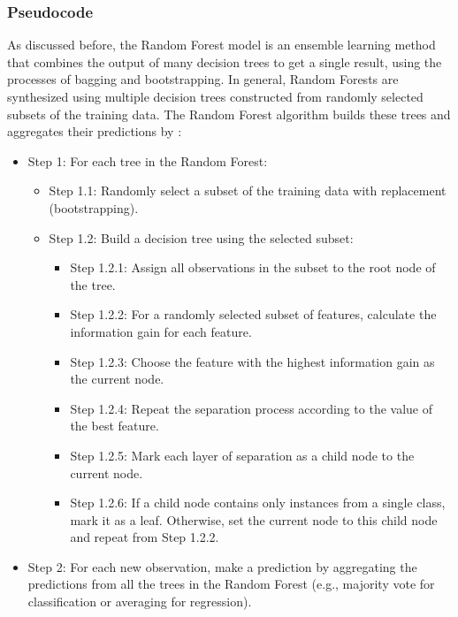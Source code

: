 \begin{appendices}
    \subsubsection{Pseudocode}

    As discussed before, the Random Forest model is an ensemble learning method that combines the output of many decision trees to get a single result, using the processes of bagging and bootstrapping. 
  In general, Random Forests are synthesized using multiple decision trees constructed from randomly selected subsets of the training data. The Random Forest algorithm builds these trees and aggregates their predictions by \cite{bernstein}:

    \begin{itemize}
        \item Step 1: For each tree in the Random Forest:
        \begin{itemize}
            \item Step 1.1: Randomly select a subset of the training data with replacement (bootstrapping).
            \item Step 1.2: Build a decision tree using the selected subset:
            \begin{itemize}
                \item Step 1.2.1: Assign all observations in the subset to the root node of the tree.
                \item Step 1.2.2: For a randomly selected subset of features, calculate the information gain for each feature.
                \item Step 1.2.3: Choose the feature with the highest information gain as the current node.
                \item Step 1.2.4: Repeat the separation process according to the value of the best feature.
                \item Step 1.2.5: Mark each layer of separation as a child node to the current node.
                \item Step 1.2.6: If a child node contains only instances from a single class, mark it as a leaf. Otherwise, set the current node to this child node and repeat from Step 1.2.2.
            \end{itemize}
        \end{itemize}
        \item Step 2: For each new observation, make a prediction by aggregating the predictions from all the trees in the Random Forest (e.g., majority vote for classification or averaging for regression).
    \end{itemize}


\end{appendices}
